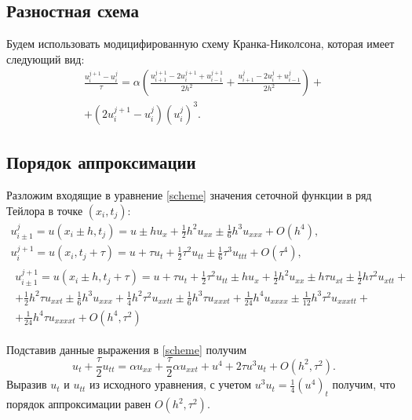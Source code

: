 \documentclass[a4paper,12pt]{article}
\begin{document}
\subsection*{Разностная схема}
Будем использовать модицифированную схему Кранка-Николсона, которая имеет следующий вид:
\begin{multline}\label{scheme}
  \frac{u_{i}^{j+1}-u_{i}^{j}}{\tau}=\alpha\left(\frac{u_{i+1}^{j+1}-2u_{i}^{j+1}+u_{i-1}^{j+1}}{2h^2}+\frac{u_{i+1}^{j}-2u_{i}^{j}+u_{i-1}^{j}}{2h^2}\right) + \\
  + \left(2u_{i}^{j+1}-u_{i}^{j}\right)\left(u_{i}^{j}\right)^3.
\end{multline}

\subsection*{Порядок аппроксимации}

Разложим входящие в уравнение \cref{scheme} значения сеточной функции в ряд Тейлора в точке \((x_i, t_j)\):
\begin{gather*}
  u_{i\pm1}^{j}=u(x_{i}\pm h, t_{j})=u \pm h u_x +\frac{1}{2} h^2 u_{xx} \pm \frac{1}{6} h^3 u_{xxx} + O(h^{4}),\\
  u_{i}^{j+1}=u(x_{i}, t_{j}+\tau)=u + \tau u_t +\frac{1}{2} \tau^2 u_{tt} \pm \frac{1}{6} \tau^3 u_{ttt} + O(\tau^{4}),\\
  \begin{split}
    u_{i\pm1}^{j+1}=u(x_{i}\pm h,t_{j}+\tau)=u+\tau  u_t+\frac{1}{2} \tau ^2 u_{tt}\pm h u_x+\frac{1}{2} h^2 u_{xx}\pm h \tau  u_{xt}\pm \frac{1}{2} h \tau ^2 u_{xtt}+\\
    +\frac{1}{2} h^2 \tau  u_{xxt}\pm \frac{1}{6} h^3 u_{xxx}+\frac{1}{4} h^2 \tau ^2 u_{xxtt}\pm \frac{1}{6} h^3 \tau  u_{xxxt}+\frac{1}{24} h^4 u_{xxxx}\pm \frac{1}{12} h^3 \tau ^2 u_{xxxtt}+\\
    +\frac{1}{24} h^4 \tau  u_{xxxxt}+O(h^4, \tau^2)
  \end{split}
\end{gather*}

Подставив данные выражения в \cref{scheme} получим
\begin{equation*}
  u_{t}+\frac{\tau}{2} u_{tt} = \alpha u_{xx} + \frac{\tau}{2} \alpha u_{xxt} + u^4 + 2 \tau u^3 u_{t} + O(h^2, \tau^2).
\end{equation*}
Выразив \(u_{t}\) и \(u_{tt}\) из исходного уравнения, с учетом \(u^3 u_{t}=\frac{1}{4}\left(u^4\right)_t\) получим, что порядок аппроксимации равен \(O(h^2, \tau^2)\).
\end{document}
